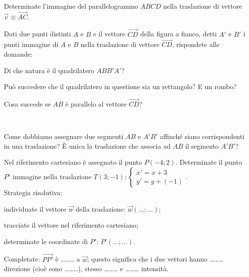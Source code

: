 \begin{esercizio}
\label{ese:8.45} %
Determinate l'immagine del parallelogrammo $ABCD$ nella traslazione di vettore $\vec{v} \equiv \overrightarrow{AC}$.
\end{esercizio}

\noindent\begin{minipage}{0.75\textwidth}\parindent15pt
\begin{esercizio}
\label{ese:8.46} %
Dati due punti distinti $A$ e $B$ e il vettore $\overrightarrow{CD}$ della figura a fianco, detti $A'$ e $B'$ i punti immagine di $A$ e $B$ nella traslazione di vettore $\overrightarrow{CD}$, rispondete alle domande:
\begin{enumeratea}
\item Di che natura è il quadrilatero $ABB'A'$?
\item Può succedere che il quadrilatero in questione sia un rettangolo? E un rombo?
\item Cosa succede se $AB$ è parallelo al vettore $\overrightarrow{CD}$?
\end{enumeratea}
\end{esercizio}
\end{minipage}\hfil
\begin{minipage}{0.25\textwidth}
	\centering~~
\end{minipage}\vspace{8pt}

\begin{esercizio}
\label{ese:8.47} %
Come dobbiamo assegnare due segmenti $AB$ e $A'B'$ affinché siano corrispondenti in una traslazione? \`E unica la traslazione che associa ad $AB$ il segmento $A'B'$?
\end{esercizio}

\begin{esercizio}
\label{ese:8.48} %
Nel riferimento cartesiano è assegnato il punto $P(-4;2)$. Determinate il punto $P'$ immagine nella traslazione $T(3;-1):\begin{cases}x'=x+3\\y'=y+(-1)\end{cases}$.\\
Strategia risolutiva:
\begin{enumerate*}
\item individuate il vettore $\vec{w}$ della traslazione: $\vec{w}(\ldots{};\ldots{})$;
\item tracciate il vettore nel riferimento cartesiano;
\item determinate le coordinate di $P'$: $P'(\ldots{};\ldots{})$.
\end{enumerate*}
Completate: $\overrightarrow{PP'}$ è \ldots\ldots\ldots{} a $\vec{w}$; questo significa che i due vettori hanno \ldots\ldots\ldots{} direzione (cioè sono \ldots\ldots\ldots{}), stesso \ldots\ldots\ldots{} e \ldots\ldots\ldots{} intensità.
\end{esercizio}


